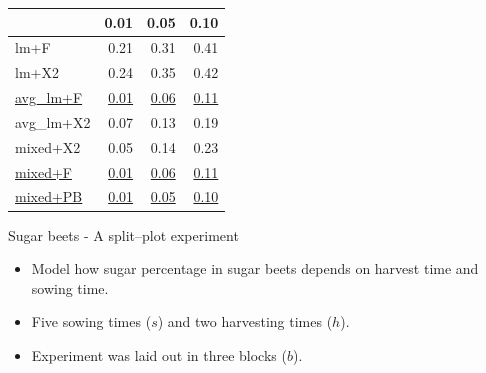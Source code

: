 \documentclass[
  ignorenonframetext,
]{beamer}
\providecommand{\tightlist}{%
  \setlength{\itemsep}{0pt}\setlength{\parskip}{0pt}}
\begin{document}
\begin{frame}

\small

\begin{table}[!h]
\centering
\begin{tabular}{lrrr}
\toprule
  & 0.01 & 0.05 & 0.10\\
\midrule
lm+F & 0.21 & 0.31 & 0.41\\
lm+X2 & 0.24 & 0.35 & 0.42\\
\underline{avg\_lm+F} & \underline{0.01} & \underline{0.06} & \underline{0.11}\\
avg\_lm+X2 & 0.07 & 0.13 & 0.19\\
mixed+X2 & 0.05 & 0.14 & 0.23\\
\underline{mixed+F} & \underline{0.01} & \underline{0.06} & \underline{0.11}\\
\underline{mixed+PB} & \underline{0.01} & \underline{0.05} & \underline{0.10}\\
\bottomrule
\end{tabular}
\end{table}

\normalsize

\end{frame}

\begin{frame}{Sugar beets - A split--plot experiment}
\protect\hypertarget{sugar-beets---a-splitplot-experiment}{}

\begin{itemize}
\tightlist
\item
  Model how sugar percentage in sugar beets depends on harvest time and
  sowing time.
\item
  Five sowing times (\(s\)) and two harvesting times (\(h\)).
\item
  Experiment was laid out in three blocks (\(b\)).
\end{itemize}

\end{frame}
\end{document}
